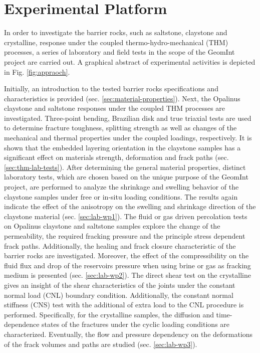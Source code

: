 \chapter{Experimental Platform}
\label{cha:exp}

In order to investigate the barrier rocks, such as saltstone, claystone and crystalline, response under the coupled thermo-hydro-mechanical (THM) processes, a series of laboratory and field tests in the scope of the GeomInt project are carried out. A graphical abstract of experimental activities is depicted in Fig. \ref{fig:appraoch}.

Initially, an introduction to the tested barrier rocks specifications and characteristics is provided (sec. \ref{sec:material-properties}). Next, the Opalinus claystone and saltstone responses under the coupled THM processes are investigated. Three-point bending, Brazilian disk and true triaxial tests are used to determine fracture toughness, splitting strength as well as changes of the mechanical and thermal properties under the coupled loadings, respectively. It is shown that the embedded layering orientation in the claystone samples has a significant effect on materials strength, deformation and frack paths (sec. \ref{sec:thm-lab-tests}).
%
After determining the general material properties, distinct laboratory tests, which are chosen based on the unique purpose of the GeomInt project, are performed to analyze the shrinkage and swelling behavior of the claystone samples under free or in-situ loading conditions. The results again indicate the effect of the anisotropy on the swelling and shrinkage direction of the claystone material (sec. \ref{sec:lab-wp1}). 
%
The fluid or gas driven percolation tests on Opalinus claystone and saltstone samples explore the change of the permeability, the required fracking pressure and the principle stress dependent frack paths. Additionally, the healing and frack closure characteristic of the barrier rocks are investigated. Moreover, the effect of the compressibility on the fluid flux and drop of the reservoirs pressure when using brine or gas as fracking medium is presented (sec. \ref{sec:lab-wp2}).
%
The direct shear test on the crystalline gives an insight of the shear characteristics of the joints under the constant normal load (CNL) boundary condition. Additionally, the constant normal stiffness (CNS) test with the additional of extra load to the CNL procedure is performed. Specifically, for the crystalline samples, the diffusion and time-dependence states of the fractures under the cyclic loading conditions are characterized. Eventually, the flow and pressure dependency on the deformations of the frack volumes and paths are studied (sec. \ref{sec:lab-wp3}).

